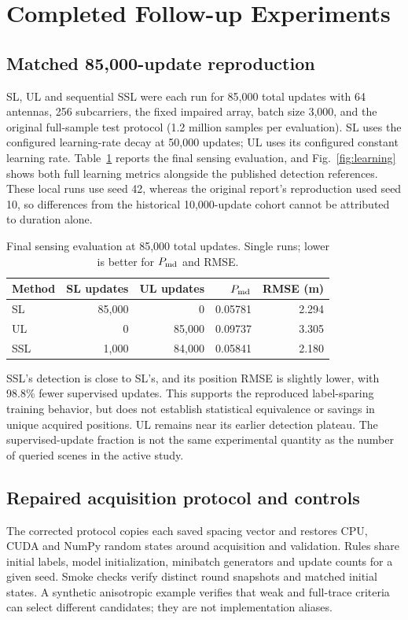 \documentclass[conference]{IEEEtran}
\begin{document}
\section{Completed Follow-up Experiments}\label{sec:extended}
\subsection{Matched 85,000-update reproduction}
SL, UL and sequential SSL were each run for 85,000 total updates with 64 antennas, 256 subcarriers, the fixed impaired array, batch size 3,000, and the original full-sample test protocol (1.2 million samples per evaluation). SL uses the configured learning-rate decay at 50,000 updates; UL uses its configured constant learning rate. Table~\ref{tab:85k} reports the final sensing evaluation, and Fig.~\ref{fig:learning} shows both full learning metrics alongside the published detection references. These local runs use seed 42, whereas the original report's reproduction used seed 10, so differences from the historical 10,000-update cohort cannot be attributed to duration alone.

\begin{table}[t]\centering\small
\caption{Final sensing evaluation at 85,000 total updates. Single runs; lower is better for $P_{\rm md}$ and RMSE.}\label{tab:85k}
\begin{tabular}{lrrrr}\toprule
Method & SL updates & UL updates & $P_{\rm md}$ & RMSE (m)\\\midrule
SL & 85,000 & 0 & 0.05781 & 2.294 \\
UL & 0 & 85,000 & 0.09737 & 3.305 \\
SSL & 1,000 & 84,000 & 0.05841 & 2.180 \\
\bottomrule\end{tabular}\end{table}

SSL's detection is close to SL's, and its position RMSE is slightly lower, with 98.8\% fewer supervised updates. This supports the reproduced label-sparing training behavior, but does not establish statistical equivalence or savings in unique acquired positions. UL remains near its earlier detection plateau. The supervised-update fraction is not the same experimental quantity as the number of queried scenes in the active study.



\subsection{Repaired acquisition protocol and controls}
The corrected protocol copies each saved spacing vector and restores CPU, CUDA and NumPy random states around acquisition and validation. Rules share initial labels, model initialization, minibatch generators and update counts for a given seed. Smoke checks verify distinct round snapshots and matched initial states. A synthetic anisotropic example verifies that weak and full-trace criteria can select different candidates; they are not implementation aliases.
\end{document}
